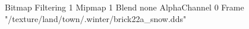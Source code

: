 {Bitmap
	{Filtering 1}
	{Mipmap 1}
	{Blend none}
	{AlphaChannel 0}
	{Frame "/texture/land/town/.winter/brick22a_snow.dds"}
}
